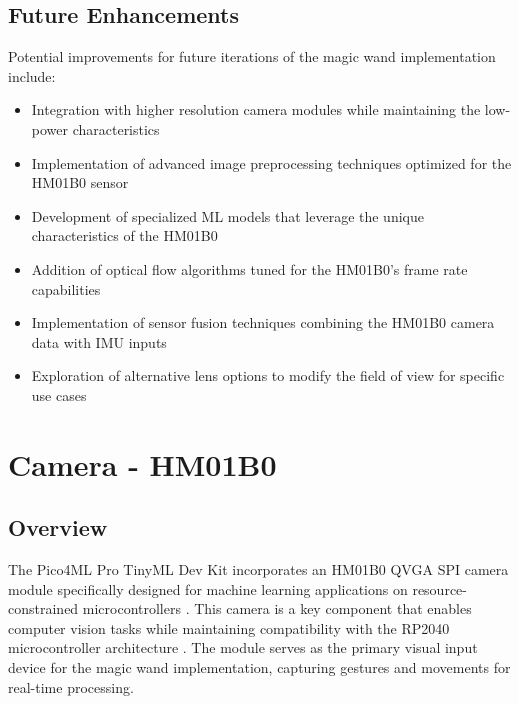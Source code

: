 \section{Future Enhancements}
Potential improvements for future iterations of the magic wand implementation include:
\begin{itemize}
	\item Integration with higher resolution camera modules while maintaining the low-power characteristics
	\item Implementation of advanced image preprocessing techniques optimized for the HM01B0 sensor
	\item Development of specialized ML models that leverage the unique characteristics of the HM01B0
	\item Addition of optical flow algorithms tuned for the HM01B0's frame rate capabilities
	\item Implementation of sensor fusion techniques combining the HM01B0 camera data with IMU inputs
	\item Exploration of alternative lens options to modify the field of view for specific use cases
\end{itemize}



\chapter{Camera - HM01B0}















\section{Overview}



The Pico4ML Pro TinyML Dev Kit incorporates an HM01B0 QVGA SPI camera module specifically designed for machine learning applications on resource-constrained microcontrollers \cite{Arducam:2023, Himax:2019}. This camera is a key component that enables computer vision tasks while maintaining compatibility with the RP2040 microcontroller architecture \cite{RaspberryPi:2020a}. The module serves as the primary visual input device for the magic wand implementation, capturing gestures and movements for real-time processing.







